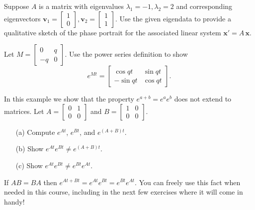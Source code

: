 \documentclass[11pt,letterpaper,boxed]{hmcpset}
\begin{document}
\begin{problem}[1.] Suppose $A$ is a matrix with eigenvalues $\lambda_1 = -1, \lambda_2=2$ and corresponding eigenvectors 
$\mathbf{v}_1=  \begin{bmatrix} 1 \\ 0 \end{bmatrix}, \mathbf{v}_2=  \begin{bmatrix} 1 \\ 1 \end{bmatrix}$.
Use the given eigendata to provide a qualitative sketch of the phase portrait for the associated linear system $\mathbf{x}' = A \, \mathbf{x}$.  
\end{problem}

\begin{solution}
\vfill
\end{solution}
\newpage

\begin{problem}[2.] Let 
$ M = \begin{bmatrix} 0 & q \\ -q & 0  \end{bmatrix}.$
 Use the power series definition  to show
 \[ e^{Mt} = \displaystyle  \begin{bmatrix} \cos qt & \sin qt \\ - \sin qt & \cos qt \end{bmatrix}. \]
\end{problem}

\begin{solution}
\vfill
\end{solution}
\newpage


\begin{problem}[3.] In this example we show that the property $e^{a+b} = e^a e^b$ does not extend  to matrices. 
Let $A = \begin{bmatrix} 0 & 1 \\ 0 & 0 \end{bmatrix}$ and $B = \begin{bmatrix} 1 & 0 \\ 0 & 0 \end{bmatrix}$.
\begin{enumerate}
\item[(a)] Compute $e^{At}$, $e^{Bt}$, and $e^{(A+B)t}$.
\item[(b)] Show $e^{At} e^{Bt} \neq e^{(A+B)t}$.
\item[(c)] Show $e^{At} e^{Bt} \neq e^{Bt} e^{At}$.
\end{enumerate}
If $AB = BA$ then $e^{At+Bt} = e^{At} e^{Bt} = e^{Bt} e^{At}$. You can freely use this fact when needed in this course, including in the next few exercises where it will come in handy!
\end{problem}
\end{document}
